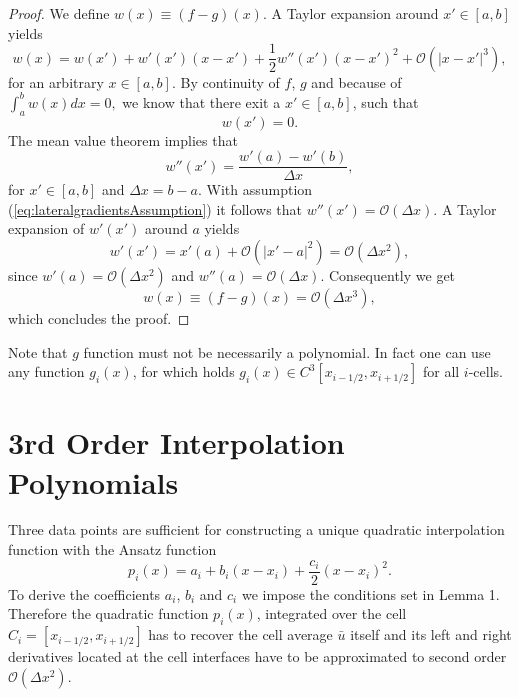\documentclass[10pt,a4paper]{article}
\begin{document}
\begin{proof}
We define $w(x)\equiv (f-g)(x)$. A Taylor expansion around $x'\in[a,b]$ yields
%
\begin{equation}
	w(x) = w(x') + w'(x')(x-x') + \frac{1}{2}w''(x')(x-x')^2 + \mathcal{O}(|x-x'|^3),
\end{equation}
%
for an arbitrary $x\in[a,b]$. By continuity of $f$, $g$ and because of $\int_{a}^{b} w(x)dx=0,$ we know that there exit a $x'\in[a,b]$, such that
%
\begin{equation}
	w(x') = 0.
\end{equation}
%
The mean value theorem implies that
%
\begin{equation}
	w''(x') = \frac{w'(a)-w'(b)}{\Delta x},
\end{equation}
%
for $x'\in[a,b]$ and $\Delta x=b-a$. With assumption (\ref{eq:lateralgradientsAssumption}) it follows that $w''(x') = \mathcal{O}(\Delta x)$. A Taylor expansion of $w'(x')$ around $a$ yields
%
\begin{equation}
	w'(x') = x'(a) + \mathcal{O}(|x'-a|^2) = \mathcal{O}(\Delta x^2),
\end{equation}
%
since $w'(a)=\mathcal{O}(\Delta x^2)$ and $w''(a) = \mathcal{O}(\Delta x)$. Consequently we get
%
\begin{equation}
	w(x)\equiv(f-g)(x)=\mathcal{O}(\Delta x^3),
\end{equation}
%
which concludes the proof. 
\end{proof}
%
Note that $g$ function must not be necessarily a polynomial. In fact one can use any function $g_i(x)$, for which holds $g_i(x)\in C^3[x_{i-1/2},x_{i+1/2}]$ for all $i$-cells.


\section{3rd Order Interpolation Polynomials}
\label{sec:IP}

Three data points are sufficient for constructing a unique quadratic interpolation function with the Ansatz function 
%
\begin{equation}
	p_i(x)=a_i+b_i(x-x_i)+\frac{c_i}{2}(x-x_i)^2.
	\label{eq:AnsatzPolynomial}
\end{equation}
%
To derive the coefficients $a_i$, $b_i$ and $c_i$ we impose the conditions set in Lemma 1. Therefore the quadratic function $p_i(x)$, integrated over the cell $C_i = [x_{i-1/2},x_{i+1/2}]$ has to recover the cell average $\bar{u}$ itself and its left and right derivatives located at the cell interfaces have to be approximated to second order $\mathcal{O}(\Delta x^2)$.
\end{document}
